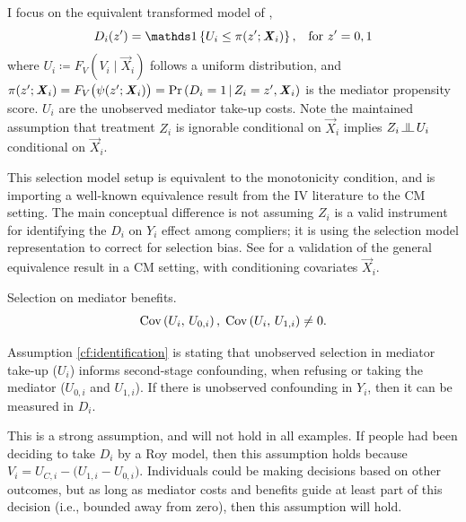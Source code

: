 I focus on the equivalent transformed model of \cite{heckman2005structural},
\[ D_i(z') = \indicator{U_i \leq \pi(z'; \vec X_i)},
    \;\;\; \text{for } z'=0,1 \]
where $U_i \coloneqq F_V\left( V_i \mid \vec X_i \right)$ follows a uniform distribution, and $\pi(z'; \boldsymbol{\mathit{X}}_i) = F_V\big(\psi(z'; \boldsymbol{\mathit{X}}_i)\big) = \Pr\left( D_i = 1 \, \middle\vert \, Z_i = z', \boldsymbol{\mathit{X}}_i \right)$ is the mediator propensity score.
$U_i$ are the unobserved mediator take-up costs.
Note the maintained assumption that treatment $Z_i$ is ignorable conditional on $\vec X_i$ implies $Z_i \indep U_i$ conditional on $\vec X_i$.

This selection model setup is equivalent to the monotonicity condition, and is importing a well-known equivalence result from the IV literature to the CM setting.
The main conceptual difference is not assuming $Z_i$ is a valid instrument for identifying the $D_i$ on $Y_i$ effect among compliers; it is using the selection model representation to correct for selection bias.
See  for a validation of the general \cite{vytlacil2002independence} equivalence result in a CM setting, with conditioning covariates $\vec X_i$.

\begin{assumptionCF}
    \label{cf:identification}
    Selection on mediator benefits.
    \[ \text{Cov} \left( U_i, \, U_{0,i} \right), \; \text{Cov} \left( U_i, \, U_{1,i} \right) \neq 0. \]
\end{assumptionCF}
\noindent
Assumption \ref{cf:identification} is stating that unobserved selection in mediator take-up ($U_i$) informs second-stage confounding, when refusing or taking the mediator ($U_{0,i}$ and $U_{1,i}$).
If there is unobserved confounding in $Y_i$, then it can be measured in $D_i$.

This is a strong assumption, and will not hold in all examples.
If people had been deciding to take $D_i$ by a Roy model, then this assumption holds because $V_i = U_{C,i} - \big( U_{1,i} - U_{0,i} \big)$.
Individuals could be making decisions based on other outcomes, but as long as mediator costs and benefits guide at least part of this decision (i.e., bounded away from zero), then this assumption will hold.

